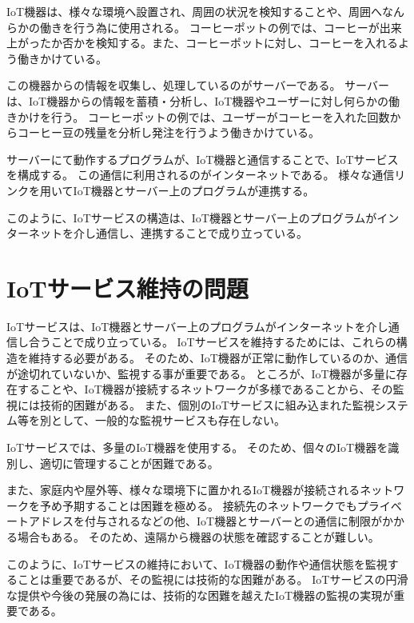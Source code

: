 IoT機器は、様々な環境へ設置され、周囲の状況を検知することや、周囲へなんらかの働きを行う為に使用される。
コーヒーポットの例では、コーヒーが出来上がったか否かを検知する。また、コーヒーポットに対し、コーヒーを入れるよう働きかけている。
\medskip

この機器からの情報を収集し、処理しているのがサーバーである。
サーバーは、IoT機器からの情報を蓄積・分析し、IoT機器やユーザーに対し何らかの働きかけを行う。
コーヒーポットの例では、ユーザーがコーヒーを入れた回数からコーヒー豆の残量を分析し発注を行うよう働きかけている。
\medskip

サーバーにて動作するプログラムが、IoT機器と通信することで、IoTサービスを構成する。
この通信に利用されるのがインターネットである。
様々な通信リンクを用いてIoT機器とサーバー上のプログラムが連携する。
\medskip

このように、IoTサービスの構造は、IoT機器とサーバー上のプログラムがインターネットを介し通信し、連携することで成り立っている。

\section{IoTサービス維持の問題}
IoTサービスは、IoT機器とサーバー上のプログラムがインターネットを介し通信し合うことで成り立っている。
IoTサービスを維持するためには、これらの構造を維持する必要がある。
そのため、IoT機器が正常に動作しているのか、通信が途切れていないか、監視する事が重要である。
ところが、IoT機器が多量に存在することや、IoT機器が接続するネットワークが多様であることから、その監視には技術的困難がある。
また、個別のIoTサービスに組み込まれた監視システム等を別として、一般的な監視サービスも存在しない。
\medskip

IoTサービスでは、多量のIoT機器を使用する。
そのため、個々のIoT機器を識別し、適切に管理することが困難である。
\medskip

また、家庭内や屋外等、様々な環境下に置かれるIoT機器が接続されるネットワークを予め予期することは困難を極める。
接続先のネットワークでもプライベートアドレスを付与されるなどの他、IoT機器とサーバーとの通信に制限がかかる場合もある。
そのため、遠隔から機器の状態を確認することが難しい。
\medskip

このように、IoTサービスの維持において、IoT機器の動作や通信状態を監視することは重要であるが、その監視には技術的な困難がある。
IoTサービスの円滑な提供や今後の発展の為には、技術的な困難を越えたIoT機器の監視の実現が重要である。



